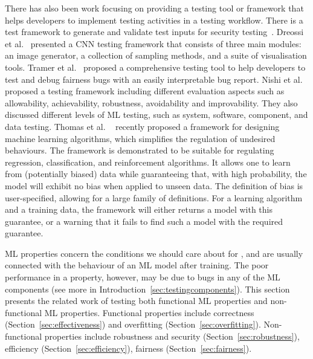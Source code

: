 \label{sec:generalframework}
There has also been work focusing on providing a testing tool or framework that helps developers to implement testing activities in a testing workflow.
There is a test framework to generate and validate test inputs for security testing~.
Dreossi et al.~ presented a CNN testing framework that consists of three main modules: an image generator, a collection of sampling methods, and a suite of visualisation tools. 
Tramer et al.~ proposed a comprehensive testing tool to help developers to test and debug fairness bugs with an easily interpretable bug report.
Nishi et al.~ proposed a testing
framework including different evaluation aspects such as allowability, achievability, robustness, avoidability and improvability.
They also discussed different levels of ML testing, such as system, software, component, and data testing.
Thomas et al. ~ recently proposed a framework for designing machine learning algorithms, which simplifies the regulation of undesired behaviours. 
The framework is demonstrated to be suitable for regulating regression, classification, and reinforcement algorithms.
It allows one to learn from (potentially biased) data
while guaranteeing that, with high
probability, the model will exhibit no bias when applied to unseen data.  
The definition of bias is user-specified, allowing for a large family of definitions.  
For a learning algorithm and a training data, the framework will either returns a model with this guarantee, or a warning that it fails to find such a model with the required
guarantee.

\label{sec:testingproperties}
ML properties concern the conditions we should care about for \mlt{}, and are usually connected with the behaviour of an ML model after training.
The poor performance in a property, however, may be due to bugs in any of the ML components (see more in Introduction~\ref{sec:testingcomponents}).
This section presents the related work of testing both functional ML properties and non-functional ML properties.
Functional properties include correctness (Section~\ref{sec:effectiveness}) and overfitting (Section~\ref{sec:overfitting}). 
Non-functional properties include robustness and security (Section~\ref{sec:robustness}), efficiency (Section~\ref{sec:efficiency}), fairness (Section~\ref{sec:fairness}).

